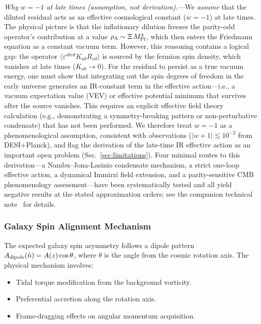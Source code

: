 \documentclass[aps,prd,twocolumn,superscriptaddress,showpacs,preprintnumbers,nofootinbib,longbibliography,floatfix]{revtex4-2}
\newcommand{\MPl}{M_{\rm Pl}}
\begin{document}
\textit{Why $w=-1$ at late times (assumption, not derivation).}---We \textit{assume} that the diluted residual acts as an effective cosmological constant ($w=-1$) at late times. The physical picture is that the inflationary dilution freezes the parity-odd operator's contribution at a value $\rho_\Lambda\sim\Xi\,\MPl^4$, which then enters the Friedmann equation as a constant vacuum term. However, this reasoning contains a logical gap: the operator $\langle\varepsilon^{abcd}K_{ab}R_{cd}\rangle$ is sourced by the fermion spin density, which vanishes at late times ($K_{ab}\to 0$). For the residual to persist as a true vacuum energy, one must show that integrating out the spin degrees of freedom in the early universe generates an IR-constant term in the effective action---i.e., a vacuum expectation value (VEV) or effective potential minimum that survives after the source vanishes. This requires an explicit effective field theory calculation (e.g., demonstrating a symmetry-breaking pattern or non-perturbative condensate) that has not been performed. We therefore treat $w=-1$ as a phenomenological assumption, consistent with observations ($|w+1|\lesssim 10^{-2}$ from DESI+Planck), and flag the derivation of the late-time IR effective action as an important open problem (Sec.~\ref{sec:limitations}). Four minimal routes to this derivation---a Nambu--Jona-Lasinio condensate mechanism, a strict one-loop effective action, a dynamical Immirzi field extension, and a parity-sensitive CMB phenomenology assessment---have been systematically tested and all yield negative results at the stated approximation orders; see the companion technical note~\cite{Golden2026supplement} for details.


\subsubsection{Galaxy Spin Alignment Mechanism}\label{sec:spinmech}

The expected galaxy spin asymmetry follows a dipole pattern $A_{\rm dipole}(\hat{n}) = A(z)\cos\theta$, where $\theta$ is the angle from the cosmic rotation axis. The physical mechanism involves:
\begin{itemize}[leftmargin=*]
\item Tidal torque modification from the background vorticity.
\item Preferential accretion along the rotation axis.
\item Frame-dragging effects on angular momentum acquisition.
\end{itemize}
\end{document}
